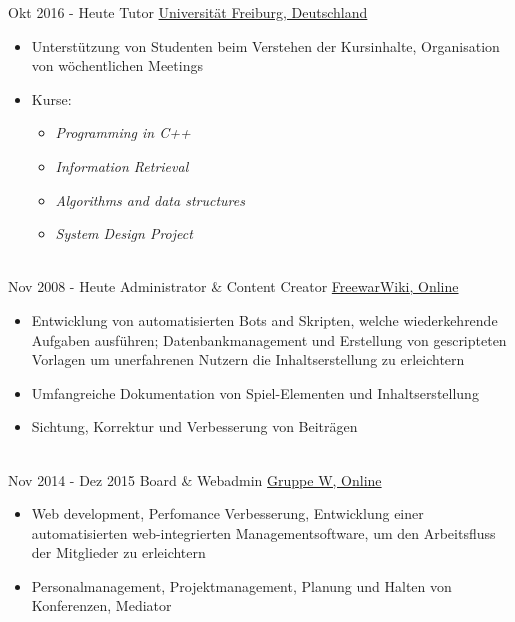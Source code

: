 \documentclass[letterpaper]{twentysecondcv_german} %
\begin{document}
\begin{twenty} %
     	\twentyitem
    		{Okt 2016 -}
		{Heute}
        		{Tutor}
        		{\href{https://www.uni-freiburg.de/}{Universität Freiburg, Deutschland}}
        		{}
        		{\begin{itemize}
        			\item Unterstützung von Studenten beim Verstehen der Kursinhalte, Organisation von wöchentlichen Meetings
        			\item Kurse:
        			\begin{itemize}
        				\item \textit{Programming in C++}
        				\item \textit{Information Retrieval}
        				\item \textit{Algorithms and data structures}
        				\item \textit{System Design Project}
        			\end{itemize}
        		\end{itemize}}\\
     	\twentyitem
    		{Nov 2008 -}
		{Heute}
        		{Administrator \& Content Creator}
        		{\href{http://www.fwwiki.de/}{FreewarWiki, Online}}
        		{}
        		{\begin{itemize}
        			\item Entwicklung von automatisierten Bots and Skripten, welche wiederkehrende Aufgaben ausführen;
        			Datenbankmanagement und Erstellung von gescripteten Vorlagen um unerfahrenen Nutzern die
        			Inhaltserstellung zu erleichtern
        			\item Umfangreiche Dokumentation von Spiel-Elementen und Inhaltserstellung
        			\item Sichtung, Korrektur und Verbesserung von Beiträgen
        		\end{itemize}}\\
	\twentyitem
    		{Nov 2014 -}
		{Dez 2015}
        		{Board \& Webadmin}
        		{\href{https://www.gruppe-w.de/}{Gruppe W, Online}}
        		{}
        		{\begin{itemize}
        			\item Web development, Perfomance Verbesserung, Entwicklung einer automatisierten web-integrierten
        			Managementsoftware, um den Arbeitsfluss der Mitglieder zu erleichtern
        			\item Personalmanagement, Projektmanagement, Planung und Halten von Konferenzen, Mediator

\end{itemize}}
\end{twenty}
\end{document}
